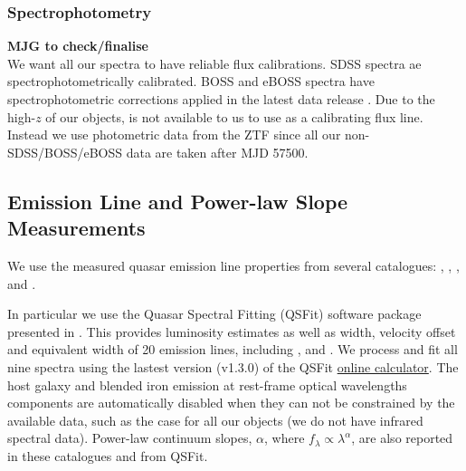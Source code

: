 \documentclass[fleqn,usenatbib]{mnras}
\begin{document}
\subsubsection{Spectrophotometry}
{\bf MJG to check/finalise} \\
We want all our spectra to have reliable flux calibrations.  SDSS
spectra ae spectrophotometrically calibrated.  BOSS and eBOSS spectra
have spectrophotometric corrections applied in the latest data release
\citep{Hutchinson2016, Jensen2016, Margala2016}.  Due to the high-$z$
of our objects, \oiii is not available to us to use as a calibrating
flux line. Instead we use photometric data from the ZTF since all our
non-SDSS/BOSS/eBOSS data are taken after MJD 57500.

\subsection{Emission Line and Power-law Slope Measurements}
We use the measured quasar emission line properties from several catalogues: 
\citet{Shen2011}, \citet{Hamann2017}, \citet{Kozlowski2017}, and
\citet{Calderone2017}.

In particular we use the Quasar Spectral Fitting (QSFit) software
package presented in \citet{Calderone2017}. This provides luminosity
estimates as well as width, velocity offset and equivalent width of 20
emission lines, including \civ, \ciii and \mgii.  We process and fit
all nine spectra using the lastest version (v1.3.0) of the QSFit
\href{https://qsfit.inaf.it/cat_1.30/onlinefit.php}{online
calculator}. The host galaxy and blended iron emission at rest-frame
optical wavelengths components are automatically disabled when they
can not be constrained by the available data, such as the case for all
our objects (we do not have infrared spectral data).  Power-law
continuum slopes, $\alpha$, where $f_{\lambda} \propto
\lambda^{\alpha}$, are also reported in these catalogues and from
QSFit.



\end{document}
